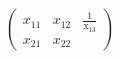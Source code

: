 \documentclass{article}
\begin{document}
\[ \left( \begin{array}{ccc}
	  x_{11} & x_{12} & \frac{1}{\displaystyle \mbox{x}_{13}} \\
	  x_{21} & x_{22} & 
	  \end{array} \right) \]
\end{document}
